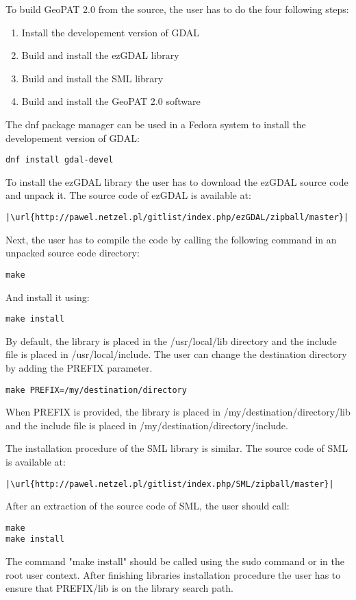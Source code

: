 To build GeoPAT 2.0 from the source, the user has to do the four following steps:

\begin{enumerate}
    \item{Install the developement version of GDAL}
    \item{Build and install the ezGDAL library}
    \item{Build and install the SML library}
    \item{Build and install the GeoPAT 2.0 software}
\end{enumerate}

The dnf package manager can be used in a Fedora system to install the developement version of GDAL:

\begin{lstlisting}
dnf install gdal-devel
\end{lstlisting}

To install the ezGDAL library the user has to download the ezGDAL source code and unpack it.
The source code of ezGDAL is available at:
\begin{lstlisting}[escapechar=|]
|\url{http://pawel.netzel.pl/gitlist/index.php/ezGDAL/zipball/master}|
\end{lstlisting}
Next, the user has to compile the code by calling the following command in an unpacked source code directory:
\begin{lstlisting}
make
\end{lstlisting}
And install it using:
\begin{lstlisting}
make install
\end{lstlisting}
By default, the library is placed in the /usr/local/lib directory and the include file is placed in /usr/local/include.
The user can change the destination directory by adding the PREFIX parameter.
\begin{lstlisting}
make PREFIX=/my/destination/directory
\end{lstlisting}
When PREFIX is provided, the library is placed in /my/destination/directory/lib and the include file is placed in /my/destination/directory/include.

The installation procedure of the SML library is similar.
The source code of SML is available at:
\begin{lstlisting}[escapechar=|]
|\url{http://pawel.netzel.pl/gitlist/index.php/SML/zipball/master}|
\end{lstlisting}
After an extraction of the source code of SML, the user should call: 
\begin{lstlisting}
make
make install
\end{lstlisting}
The command "make install" should be called using the sudo command or in the root user context.
After finishing libraries installation procedure the user has to ensure that PREFIX/lib is on the library search path.

